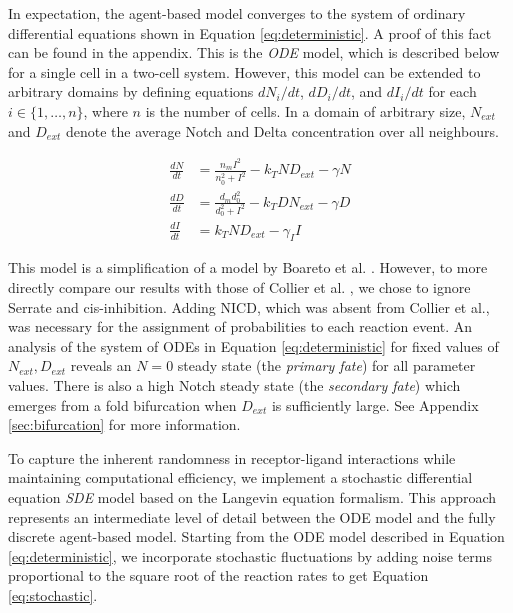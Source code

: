 \documentclass{article}
\begin{document}
\begin{flushleft}
\medskip

In expectation, the agent-based model converges to the system of ordinary differential equations shown in Equation \ref{eq:deterministic}.
A proof of this fact can be found in the appendix.
This is the \emph{ODE} model, which is described below for a single cell in a two-cell system.
However, this model can be extended to arbitrary domains by defining equations $dN_{i}/dt$, $dD_{i}/dt$, and $dI_{i}/dt$ for each $i \in \{ 1, \dots, n \}$, where $n$ is the number of cells.
In a domain of arbitrary size, $N_{ext}$ and $D_{ext}$ denote the average Notch and Delta concentration over all neighbours.

\begin{equation}
\begin{aligned}
  \frac{dN}{dt} &= \frac{n_{m}I^2}{n_{0}^2 + I^2} - k_{T}ND_{ext} - \gamma N \\[5pt]
  \frac{dD}{dt} &= \frac{d_{m}d_{0}^2}{d_{0}^2 + I^2} - k_{T}DN_{ext} - \gamma D \\[5pt]
  \frac{dI}{dt} &= k_{T}ND_{ext} - \gamma_{I}I
\end{aligned}
\label{eq:deterministic}
\end{equation}

This model is a simplification of a model by Boareto et al. \cite{boareto_jaggeddelta_2015}.
However, to more directly compare our results with those of Collier et al. \cite{collier_pattern_1996}, we chose to ignore Serrate and cis-inhibition.
Adding NICD, which was absent from Collier et al., was necessary for the assignment of probabilities to each reaction event.
An analysis of the system of ODEs in Equation \ref{eq:deterministic} for fixed values of $N_{ext}, D_{ext}$ reveals an $N = 0$ steady state (the \emph{primary fate}) for all parameter values.
There is also a high Notch steady state (the \emph{secondary fate}) which emerges from a fold bifurcation when $D_{ext}$ is sufficiently large.
See Appendix \ref{sec:bifurcation} for more information.

\medskip

To capture the inherent randomness in receptor-ligand interactions while maintaining computational efficiency, we implement a stochastic differential equation \emph{SDE} model based on the Langevin equation formalism.
This approach represents an intermediate level of detail between the ODE model and the fully discrete agent-based model.
Starting from the ODE model described in Equation \ref{eq:deterministic}, we incorporate stochastic fluctuations by adding noise terms proportional to the square root of the reaction rates to get Equation \ref{eq:stochastic}.


\end{flushleft}
\end{document}
